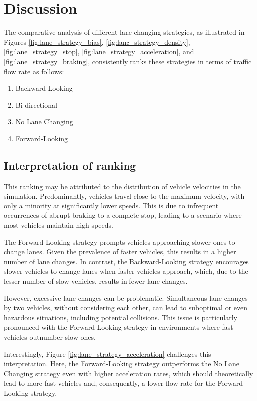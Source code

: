 \documentclass{article}
\begin{document}
\section{Discussion}

The comparative analysis of different lane-changing strategies, as illustrated in Figures \ref{fig:lane_strategy_bias}, \ref{fig:lane_strategy_density}, \ref{fig:lane_strategy_stop}, \ref{fig:lane_strategy_acceleration}, and \ref{fig:lane_strategy_braking}, consistently ranks these strategies in terms of traffic flow rate as follows:

\begin{enumerate}
\item Backward-Looking
\item Bi-directional
\item No Lane Changing
\item Forward-Looking
\end{enumerate}

\subsection{Interpretation of ranking}
This ranking may be attributed to the distribution of vehicle velocities in the simulation. Predominantly, vehicles travel close to the maximum velocity, with only a minority at significantly lower speeds. This is due to infrequent occurrences of abrupt braking to a complete stop, leading to a scenario where most vehicles maintain high speeds.

The Forward-Looking strategy prompts vehicles approaching slower ones to change lanes. Given the prevalence of faster vehicles, this results in a higher number of lane changes. In contrast, the Backward-Looking strategy encourages slower vehicles to change lanes when faster vehicles approach, which, due to the lesser number of slow vehicles, results in fewer lane changes.

However, excessive lane changes can be problematic. Simultaneous lane changes by two vehicles, without considering each other, can lead to suboptimal or even hazardous situations, including potential collisions. This issue is particularly pronounced with the Forward-Looking strategy in environments where fast vehicles outnumber slow ones.

Interestingly, Figure \ref{fig:lane_strategy_acceleration} challenges this interpretation. Here, the Forward-Looking strategy outperforms the No Lane Changing strategy even with higher acceleration rates, which should theoretically lead to more fast vehicles and, consequently, a lower flow rate for the Forward-Looking strategy.
\end{document}
